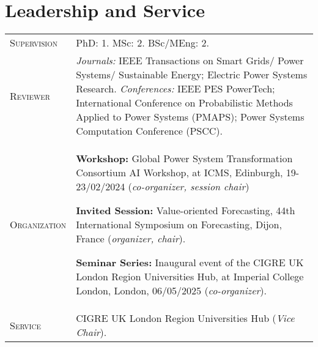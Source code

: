 \documentclass[11pt,a4paper]{article}
\makeatletter
\newlength{\datecolwidth}
\newenvironment{entrylist}{%
  \begin{longtable}{@{}p{\datecolwidth}@{\hspace{0.8em}}p{\dimexpr\linewidth-\datecolwidth-0.8em\relax}@{}}%
}{\end{longtable}}
\newcommand{\entry}[4]{%
  \textbf{#1} & \textbf{#2}\\[-0.2em]
              & {\itshape #3}\\[-0.2em]
              & #4\\[0.8em]
}
\newcommand{\supervision}[4]{%
  \textbf{#1} & \textbf{#2} ({#3}) \\[-0.2em]
                 & \emph{#4} \\[0.8em]
}
\newcommand{\labelstyle}[1]{\textsc{#1}}   %
\newcommand{\entrylabel}[2]{%
  \labelstyle{#1} & #2\\[0.8em]
}
\makeatother
\begin{document}

\section*{Leadership and Service}
\begin{entrylist}
    \entrylabel{Supervision}{%
    PhD: 1.
    MSc: 2.
    BSc/MEng: 2.
  }
  \entrylabel{Reviewer}{%
    \emph{Journals:} IEEE Transactions on Smart Grids/ Power Systems/ Sustainable Energy; Electric Power Systems Research.
    \emph{Conferences:} IEEE PES PowerTech; International Conference on Probabilistic Methods Applied to Power Systems
(PMAPS); Power Systems Computation Conference (PSCC).
  }

  \entrylabel{Organization}{

  \textbf{Workshop:} Global Power System Transformation Consortium AI Workshop, at ICMS, Edinburgh, 19-23/02/2024 (\emph{co-organizer, session chair})

  \textbf{Invited Session:} Value-oriented Forecasting, 44th International Symposium on
Forecasting, Dijon, France (\emph{organizer, chair}).

  \textbf{Seminar Series:} Inaugural event of the CIGRE UK London Region Universities Hub, at Imperial College London, 
  London, 06/05/2025 (\emph{co-organizer}).  }

  \entrylabel{Service}{

  CIGRE UK London Region Universities Hub (\emph{Vice Chair}).

  }

\end{entrylist}



\end{document}
